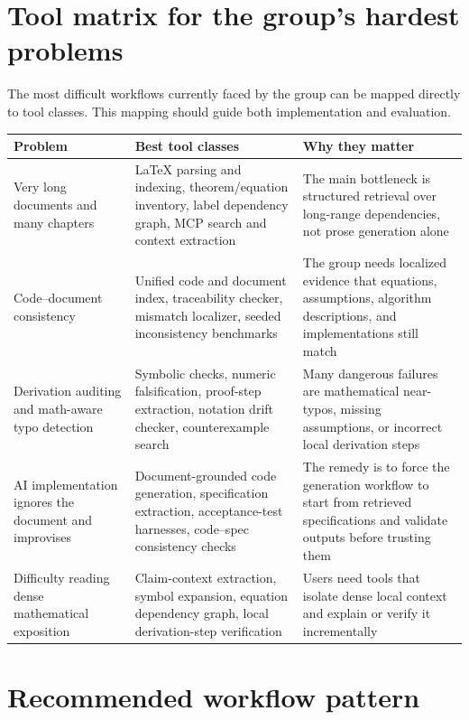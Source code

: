 \section{Tool matrix for the group's hardest problems}

The most difficult workflows currently faced by the group can be mapped directly to tool classes. This mapping should guide both implementation and evaluation.

\begin{longtable}{p{}p{}p{}}
\toprule
\textbf{Problem} & \textbf{Best tool classes} & \textbf{Why they matter} \\
\midrule
Very long documents and many chapters & LaTeX parsing and indexing, theorem/equation inventory, label dependency graph, MCP search and context extraction & The main bottleneck is structured retrieval over long-range dependencies, not prose generation alone \\
Code--document consistency & Unified code and document index, traceability checker, mismatch localizer, seeded inconsistency benchmarks & The group needs localized evidence that equations, assumptions, algorithm descriptions, and implementations still match \\
Derivation auditing and math-aware typo detection & Symbolic checks, numeric falsification, proof-step extraction, notation drift checker, counterexample search & Many dangerous failures are mathematical near-typos, missing assumptions, or incorrect local derivation steps \\
AI implementation ignores the document and improvises & Document-grounded code generation, specification extraction, acceptance-test harnesses, code--spec consistency checks & The remedy is to force the generation workflow to start from retrieved specifications and validate outputs before trusting them \\
Difficulty reading dense mathematical exposition & Claim-context extraction, symbol expansion, equation dependency graph, local derivation-step verification & Users need tools that isolate dense local context and explain or verify it incrementally \\
\bottomrule
\end{longtable}

\section{Recommended workflow pattern}

